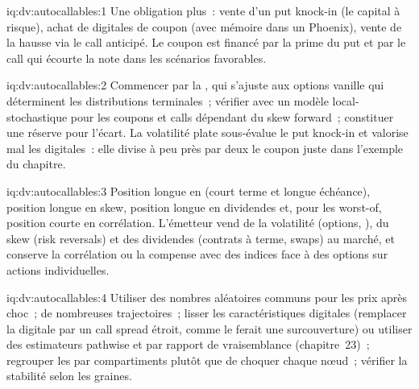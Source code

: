 \begin{solution}{iq:dv:autocallables:1}
Une obligation plus~: vente d'un put knock-in (le capital à risque), achat de digitales de coupon (avec mémoire dans un Phoenix), vente de la hausse via le
call anticipé. Le coupon est financé par la prime du put et par le call qui écourte la note dans les scénarios favorables.
\end{solution}

\begin{solution}{iq:dv:autocallables:2}
Commencer par la , qui s'ajuste aux options vanille qui déterminent les distributions terminales~; vérifier avec un modèle local-stochastique pour les
coupons et calls dépendant du skew forward~; constituer une réserve pour l'écart. La volatilité plate sous-évalue le put knock-in et valorise mal les
digitales~: elle divise à peu près par deux le coupon juste dans l'exemple du chapitre.
\end{solution}

\begin{solution}{iq:dv:autocallables:3}
Position longue en  (court terme et longue échéance), position longue en skew, position longue en dividendes et, pour les worst-of, position courte en corrélation. L'émetteur vend de la volatilité (options,
), du skew (risk reversals) et des dividendes (contrats à terme, swaps) au marché, et conserve la corrélation ou la compense avec des indices face à
des options sur actions individuelles.
\end{solution}

\begin{solution}{iq:dv:autocallables:4}
Utiliser des nombres aléatoires communs pour les prix après choc~; de nombreuses trajectoires~; lisser les caractéristiques digitales (remplacer la digitale par un call spread étroit, comme le ferait une
surcouverture) ou utiliser des estimateurs pathwise et par rapport de vraisemblance (chapitre~23)~; regrouper les  par compartiments plutôt que de choquer chaque nœud~; vérifier la stabilité
selon les graines.
\end{solution}

